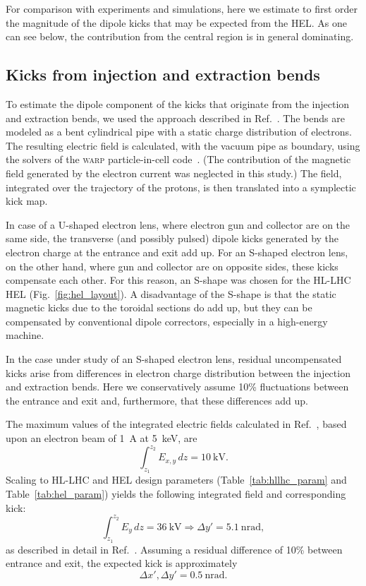 \documentclass[
prstab
,reprint
,linenumbers
,longbibliography
,preprintnumbers
,showkeys
,amsfonts,amssymb,amsmath
,floatfix
]{revtex4-1}
\newcommand{\q}[2]{\ensuremath{#1\ \mathrm{#2}}} %
\newcommand{\code}[1]{\textsc{#1}} %
\begin{document}
For comparison with experiments and simulations, here we estimate to
first order the magnitude of the dipole kicks that may be expected
from the HEL. As one can see below, the contribution from the central
region is in general dominating.


\subsection{Kicks from injection and extraction bends}
\label{core:sec:1}

To estimate the dipole component of the kicks that originate from the
injection and extraction bends, we used the approach described in
Ref.~\cite{hel_bends_stancari}. The bends are modeled as a bent
cylindrical pipe with a static charge distribution of electrons. The
resulting electric field is calculated, with the vacuum pipe as
boundary, using the solvers of the \code{warp} particle-in-cell
code~\cite{warp, Friedman:IEEE-plasma:2014}. (The contribution of the
magnetic field generated by the electron current was neglected in this
study.) The field, integrated over the trajectory of the protons, is
then translated into a symplectic kick map.

In case of a U-shaped electron lens, where electron gun and collector
are on the same side, the transverse (and possibly pulsed) dipole
kicks generated by the electron charge at the entrance and exit add
up. For an S-shaped electron lens, on the other hand, where gun and
collector are on opposite sides, these kicks compensate each
other. For this reason, an S-shape was chosen for the HL-LHC HEL
(Fig.~\ref{fig:hel_layout}). A disadvantage of the S-shape is that the
static magnetic kicks due to the toroidal sections do add up, but they
can be compensated by conventional dipole correctors, especially in a
high-energy machine.

In the case under study of an S-shaped electron lens, residual
uncompensated kicks arise from differences in electron charge
distribution between the injection and extraction bends. Here we
conservatively assume 10\% fluctuations between the entrance and exit
and, furthermore, that these differences add up.

The maximum values of the integrated electric fields calculated in
Ref.~\cite{hel_bends_stancari}, based upon an electron beam of 1~A at
5~keV, are
%
\begin{equation}
  \int_{z_1}^{z_2} E_{x,y} \, dz= \q{10}{kV}.
\end{equation}
%
Scaling to HL-LHC and HEL design parameters
(Table~\ref{tab:hllhc_param} and Table~\ref{tab:hel_param}) yields the
following integrated field and corresponding kick:
%
\begin{equation}
  \int_{z_1}^{z_2} E_{y} \, dz = \q{36}{kV} \Rightarrow \Delta y' = \q{5.1}{nrad},
\end{equation}
%
as described in detail in
Ref.~\cite{md_sim_hel_res_ex_fitterer}. Assuming a residual difference
of 10\% between entrance and exit, the expected kick is approximately
%
\begin{equation}
  \label{eqn:kick_bends}
  \Delta x', \Delta y' = \q{0.5}{nrad}.
\end{equation}
\end{document}
